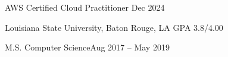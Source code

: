 \documentclass[10pt,a4paper]{article}
\begin{document}


\spacedhrule{0em}{-1em}

%
%


\headedsection
{AWS Certified Cloud Practitioner}
{}{Dec 2024}

\spacedhrule{0em}{-1em}  %

\headedsection
{Louisiana State University, Baton Rouge, LA}
{GPA 3.8/4.00}{

  \headedsubsection
  {M.S. Computer Science}{Aug 2017
    -- May 2019}{}
}
\end{document}
